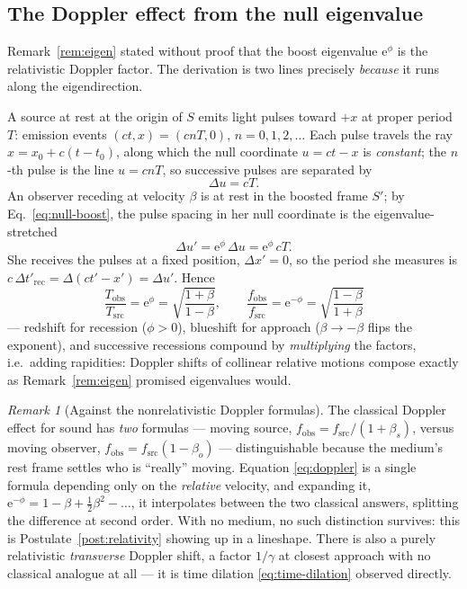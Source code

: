 \documentclass[11pt]{article}
\theoremstyle{plain}
\theoremstyle{definition}
\theoremstyle{remark}
\newtheorem{remark}[theorem]{Remark}
\newcommand{\ee}{\mathrm{e}}
\begin{document}
\subsection{The Doppler effect from the null eigenvalue}
\label{sec:doppler}

Remark~\ref{rem:eigen} stated without proof that the boost eigenvalue
$\ee^{\phi}$ is the relativistic Doppler factor. The derivation is two
lines precisely \emph{because} it runs along the eigendirection.

A source at rest at the origin of $S$ emits light pulses toward $+x$ at
proper period $T$: emission events $(ct, x) = (cnT, 0)$,
$n = 0, 1, 2, \dots$ Each pulse travels the ray
$x = x_0 + c(t - t_0)$, along which the null coordinate
$u = ct - x$ is \emph{constant}; the $n$-th pulse is the line
$u = cnT$, so successive pulses are separated by
\begin{equation}
  \Delta u = cT .
\end{equation}
An observer receding at velocity $\beta$ is at rest in the boosted
frame $S'$; by Eq.~\eqref{eq:null-boost}, the pulse spacing in her null
coordinate is the eigenvalue-stretched
\begin{equation}
  \Delta u' = \ee^{\phi}\, \Delta u = \ee^{\phi}\, cT .
\end{equation}
She receives the pulses at a fixed position, $\Delta x' = 0$, so the
period she measures is
$c\,\Delta t'_{\text{rec}} = \Delta(ct' - x') = \Delta u'$. Hence
\begin{equation}
  \boxed{\;
  \frac{T_{\text{obs}}}{T_{\text{src}}}
  = \ee^{\phi}
  = \sqrt{\frac{1+\beta}{1-\beta}},
  \qquad
  \frac{f_{\text{obs}}}{f_{\text{src}}}
  = \ee^{-\phi}
  = \sqrt{\frac{1-\beta}{1+\beta}}
  \;}
  \label{eq:doppler}
\end{equation}
--- redshift for recession ($\phi > 0$), blueshift for approach
($\beta \to -\beta$ flips the exponent), and successive recessions
compound by \emph{multiplying} the factors, i.e.\ adding rapidities:
Doppler shifts of collinear relative motions compose exactly as
Remark~\ref{rem:eigen} promised eigenvalues would.

\begin{remark}[Against the nonrelativistic Doppler formulas]
The classical Doppler effect for sound has \emph{two} formulas ---
moving source, $f_{\text{obs}} = f_{\text{src}}/(1 + \beta_s)$, versus
moving observer, $f_{\text{obs}} = f_{\text{src}}(1 - \beta_o)$ ---
distinguishable because the medium's rest frame settles who is
``really'' moving. Equation \eqref{eq:doppler} is a single formula
depending only on the \emph{relative} velocity, and expanding it,
$\ee^{-\phi} = 1 - \beta + \tfrac12\beta^2 - \dots$, it interpolates
between the two classical answers, splitting the difference at second
order. With no medium, no such distinction survives: this is
Postulate~\ref{post:relativity} showing up in a lineshape. There is
also a purely relativistic \emph{transverse} Doppler shift, a factor
$1/\gamma$ at closest approach with no classical analogue at all ---
it is time dilation \eqref{eq:time-dilation} observed directly.
\end{remark}
\end{document}
